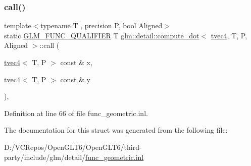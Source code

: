 \subsubsection{\texorpdfstring{call()}{call()}}
{\footnotesize\ttfamily template$<$typename T , precision P, bool Aligned$>$ \\
static \mbox{\hyperlink{setup_8hpp_a33fdea6f91c5f834105f7415e2a64407}{G\+L\+M\+\_\+\+F\+U\+N\+C\+\_\+\+Q\+U\+A\+L\+I\+F\+I\+ER}} T \mbox{\hyperlink{structglm_1_1detail_1_1compute__dot}{glm\+::detail\+::compute\+\_\+dot}}$<$ \mbox{\hyperlink{structglm_1_1tvec4}{tvec4}}, T, P, Aligned $>$\+::call (\begin{DoxyParamCaption}\item[{\mbox{\hyperlink{structglm_1_1tvec4}{tvec4}}$<$ T, P $>$ const \&}]{x,  }\item[{\mbox{\hyperlink{structglm_1_1tvec4}{tvec4}}$<$ T, P $>$ const \&}]{y }\end{DoxyParamCaption})\hspace{0.3cm}{\ttfamily [inline]}, {\ttfamily [static]}}



Definition at line 66 of file func\+\_\+geometric.\+inl.



The documentation for this struct was generated from the following file\+:\begin{DoxyCompactItemize}
\item 
D\+:/\+V\+C\+Repos/\+Open\+G\+L\+T6/\+Open\+G\+L\+T6/third-\/party/include/glm/detail/\mbox{\hyperlink{func__geometric_8inl}{func\+\_\+geometric.\+inl}}\end{DoxyCompactItemize}
